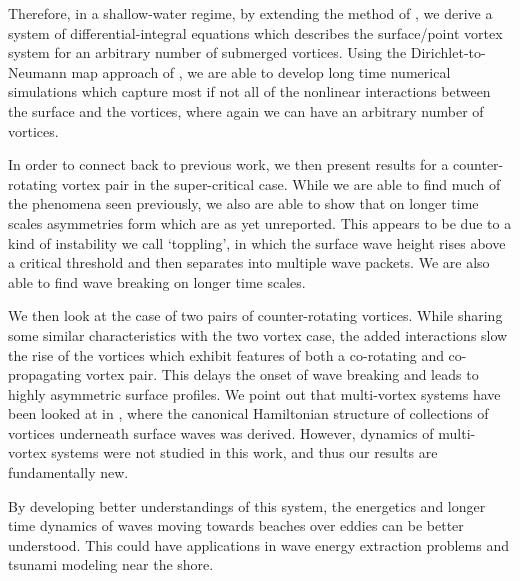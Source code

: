 \documentclass[a4paper,11pt]{article}
\begin{document}
Therefore, in a shallow-water regime, by extending the method of \cite{afm}, we derive a system of differential-integral equations which describes the surface/point vortex system for an arbitrary number of submerged vortices.  Using the Dirichlet-to-Neumann map approach of \cite{craig}, we are able to develop long time numerical simulations which capture most if not all of the nonlinear interactions between the surface and the vortices, where again we can have an arbitrary number of vortices.

In order to connect back to previous work, we then present results for a counter-rotating vortex pair in the super-critical case.  While we are able to find much of the phenomena seen previously, we also are able to show that on longer time scales asymmetries form which are as yet unreported.  This appears to be due to a kind of instability we call `toppling', in which the surface wave height rises above a critical threshold and then separates into multiple wave packets.  We are also able to find wave breaking on longer time scales. 

We then look at the case of two pairs of counter-rotating vortices.  While sharing some similar characteristics with the two vortex case, the added interactions slow the rise of the vortices which exhibit features of both a co-rotating and co-propagating vortex pair.  This delays the onset of wave breaking and leads to highly asymmetric surface profiles.  We point out that multi-vortex systems have been looked at in \cite{rouhi}, where the canonical Hamiltonian structure of collections of vortices underneath surface waves was derived.  However, dynamics of multi-vortex systems were not studied in this work, and thus our results are fundamentally new. 

By developing better understandings of this system, the energetics and longer time dynamics of waves moving towards beaches over eddies can be better understood.  This could have applications in wave energy extraction problems and tsunami modeling near the shore.  
\end{document}
